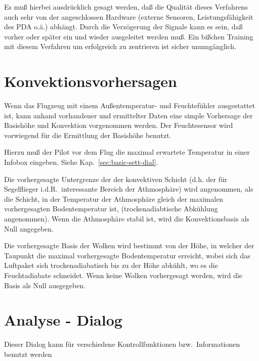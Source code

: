 Es muß hierbei ausdrücklich gesagt werden, daß die Qualität dieses Verfahrens auch sehr von der
angeschlossen
Hardware (externe Sensoren,  Leistungsfähigkeit des PDA o.ä.) abhängt. Durch die Verzögerung der
Signale kann es sein, daß vorher oder später ein und wieder ausgeleitet werden muß.
Ein bißchen Training mit diesem Verfahren um  erfolgreich zu zentrieren ist sicher unumgänglich.


\section{Konvektionsvorhersagen}\label{sec:convection-forecast}
Wenn das Flugzeug mit einem Außentemperatur- und Feuchtefühler ausgestattet ist, kann anhand
vorhandener und ermittelter Daten  eine simple Vorhersage der Basishöhe und Konvektion vorgenommen werden. Der Feuchtesensor wird vorwiegend für die Ermittlung der Basishöhe benutzt.

Hierzu muß der Pilot vor dem Flug die maximal erwartete Temperatur in einer Infobox eingeben.
 Siehe Kap.~\ref{sec:basic-sett-dial}.

Die vorhergesagte  Untergrenze der der konvektiven Schicht (d.h. der für Segelflieger i.d.R.\ interessante
Bereich der Athmosphäre) wird angenommen, als die Schicht, in der Temperatur der Athmosphäre gleich der maximalen vorhergesagten Bodentemperatur ist, (trockenadiabtische Abkühlung angenommen).
Wenn die Athmosphäre stabil ist, wird die Konvektionsbasis als Null angegeben.

Die vorhergesagte Basis der Wolken wird bestimmt von der Höhe, in welcher der Taupunkt die
maximal vorhergesagte Bodentemperatur erreicht, wobei sich das Luftpaket sich trockenadiabatisch bis
zu der Höhe abkühlt, wo es die Feuchtadiabate schneidet. Wenn keine Wolken vorhergesagt werden, wird die Basis als Null ausgegeben.

\section{Analyse - Dialog}
Dieser Dialog kann für verschiedene Kontrollfunktionen bzw.\ Informationen benutzt werden 



